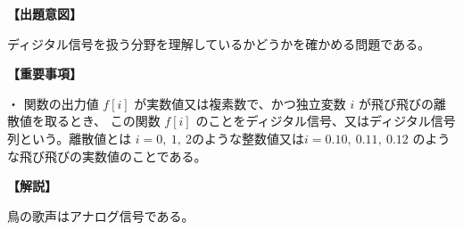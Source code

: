 \noindent \textbf{【出題意図】}

\noindent ディジタル信号を扱う分野を理解しているかどうかを確かめる問題である。

\vspace{1em}
\noindent \textbf{【重要事項】}

\medskip
\noindent ・ 関数の出力値 $f[i]$ が実数値又は複素数で、かつ独立変数 $i$ が飛び飛びの離散値を取るとき、 この関数 $f[i]$ のことをディジタル信号、又はディジタル信号列という。離散値とは $i=0,\ 1,\ 2$のような整数値又は$i=0.10,\ 0.11,\ 0.12$ のような飛び飛びの実数値のことである。

\vspace{1em}
\noindent \textbf{【解説】}

\noindent 鳥の歌声はアナログ信号である。
